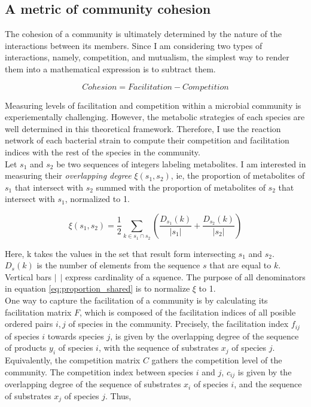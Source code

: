 \documentclass[titlepage,11pt]{article}
\begin{document}
\begin{linenumbers}
\begin{singlespace}
				\subsection{A metric of community cohesion}
					The cohesion of a community is ultimately determined by the nature of the interactions between its members. Since I am considering two types of interactions, namely, competition, and mutualism, the simplest way to render them into a mathematical expression is to subtract them.
					\begin{linenomath*}
						\begin{equation}\label{eq:cohesion_idea}
							Cohesion = Facilitation - Competition
						\end{equation}
					\end{linenomath*}
					Measuring levels of facilitation and competition within a microbial community is experiementally challenging. However, the metabolic strategies of each species are well determined in this theoretical framework. Therefore, I use the reaction network of each bacterial strain to compute their competition and facilitation indices with the rest of the species in the community.\\ 
					Let $ s_1 $ and $ s_2 $ be two sequences of integers labeling metabolites. I am interested in measuring  their \textit{overlapping degree} $ \xi(s_1, s_2) $, ie, the proportion of metabolites of $ s_1 $ that intersect with $ s_2 $ summed with the proportion of metabolites of $ s_2 $ that intersect with $ s_1 $, normalized to 1.
					\begin{linenomath*}	
						\begin{equation}\label{eq:proportion_shared}
							\xi (s_1, s_2) = \frac {1}{2} \sum_{k \in s_1 \cap s_2} \left(\frac{D_{s_1}(k)}{|s_1|} + \frac{D_{s_2}(k)}{|s_2|}\right)
						\end{equation}
					\end{linenomath*}	
					Here, k takes the values in the set that result form intersecting $ s_1 $ and $ s_2 $. $ D_s(k) $ is the number of elements from the sequence $ s $ that are equal to $ k $. Vertical bars $  | \ \ | $ express cardinality of a squence. The purpose of all denominators in equation \ref{eq:proportion_shared} is to normalize $ \xi $ to 1.\\
					One way to capture the facilitation of a community is by calculating its facilitation matrix $ F $, which is composed of the facilitation indices of all posible ordered pairs $ i, j $ of species in the community. Precisely, the facilitation index $ f_{ij} $ of species $ i $ towards species $ j $, is given by the overlapping degree of the sequence of products $ y_i $ of species $ i $,  with the sequence of substrates $ x_j $ of species $ j $. Equivalently, the competition matrix $ C $ gathers the competition level of the community. The competition index between species $ i $ and $ j $,  $ c_{ij} $  is given by the overlapping degree of the sequence of substrates $ x_i $ of species $ i $,  and the sequence of substrates $ x_j $ of species $ j $. Thus, 

\end{singlespace}
\end{linenumbers}
\end{document}

